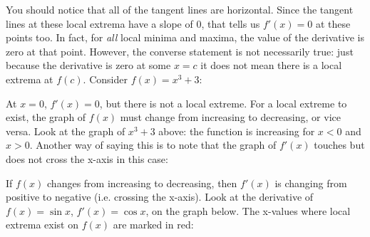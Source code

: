 

You should notice that all of the tangent lines are horizontal. Since the tangent lines at these local extrema have a slope of $0$, that tells us $f'(x)=0$ at these points too. In fact, for \textit{all} local minima and maxima, the value of the derivative is zero at that point. However, the converse statement is not necessarily true: just because the derivative is zero at some $x=c$ it does not mean there is a local extrema at $f(c)$. Consider $f(x) = x^3+3$:


At $x=0$, $f'(x)=0$, but there is not a local extreme. For a local extreme to exist, the graph of $f(x)$ must change from increasing to decreasing, or vice versa. Look at the graph of $x^3+3$ above: the function is increasing for $x<0$ and $x>0$. Another way of saying this is to note that the graph of $f'(x)$ touches but does not cross the x-axis in this case:


If $f(x)$ changes from increasing to decreasing, then $f'(x)$ is changing from positive to negative (i.e. crossing the x-axis). Look at the derivative of $f(x)=\sin{x}$, $f'(x)=\cos{x}$, on the graph below. The x-values where local extrema exist on $f(x)$ are marked in red:

